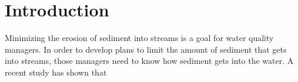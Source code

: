 \section{Introduction}
Minimizing the erosion of sediment into streams is a goal for water quality managers. In order to develop plans to limit the amount of sediment that gets into streams, those managers need to know how sediment gets into the water. A recent study \cite{Danz:2010} has shown that